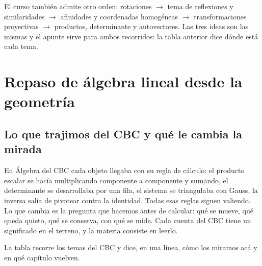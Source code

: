 \begin{atencion}
El curso también admite otro orden: rotaciones \(\to\) tema de
reflexiones y similaridades \(\to\) afinidades y coordenadas homogéneas \(\to\)
transformaciones proyectivas \(\to\) productos, determinante y autovectores. Las tres ideas
son las mismas y el apunte sirve para ambos recorridos: la tabla anterior dice dónde está
cada tema.
\end{atencion}

\section{Repaso de álgebra lineal desde la geometría}\label{cap:repaso-algebra}

\subsection{Lo que trajimos del CBC y qué le cambia la mirada}\label{sec:cbc-mirada}

En Álgebra del CBC cada objeto llegaba con su regla de cálculo: el producto escalar se hacía
multiplicando componente a componente y sumando, el determinante se desarrollaba por una fila,
el sistema se triangulaba con Gauss, la inversa salía de pivotear contra la identidad. Todas
esas reglas siguen valiendo. Lo que cambia es la pregunta que hacemos antes de calcular: qué se
mueve, qué queda quieto, qué se conserva, con qué se mide. Cada cuenta del CBC tiene un
significado en el terreno, y la materia consiste en leerlo.

La tabla recorre los temas del CBC y dice, en una línea, cómo los miramos acá y en qué
capítulo vuelven.

